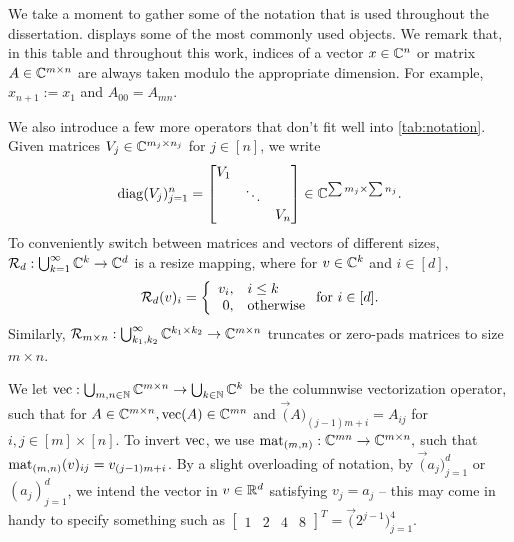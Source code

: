 We take a moment to gather some of the notation that is used throughout the dissertation.   displays some of the most commonly used objects.  We remark that, in this table and throughout this work, indices of a vector $x \in \Cn$ or matrix $A \in \Cmxn$ are always taken modulo the appropriate dimension.  For example, $x_{n + 1} := x_1$ and $A_{00} = A_{mn}$.

We also introduce a few more operators that don't fit well into \cref{tab:notation}.  Given matrices $V_j \in \C^{m_j \times n_j}$ for $j \in [n]$, we write \[\diag(V_j)_{j = 1}^n = \begin{bmatrix} V_1 & & \\ & \ddots & \\ & & V_n \end{bmatrix} \in \C^{\sum m_j \times \sum n_j}.\]  To conveniently switch between matrices and vectors of different sizes, $\mathcal{R}_d : \bigcup_{k = 1}^\infty \C^k \to \C^d$ is a resize mapping, where for $v \in \C^k$ and $i \in [d],$ $$\mathcal{R}_d(v)_i = \left\{\begin{array}{r@{,\quad}l} v_i & i \le k \\ 0 & \text{otherwise} \end{array}\right. \text{for}\ i \in [d].$$  Similarly, $\mathcal{R}_{m \times n} : \bigcup_{k_1, k_2}^\infty \C^{k_1 \times k_2} \to \C^{m \times n}$ truncates or zero-pads matrices to size $m \times n$.  

We let $\vec : \bigcup_{m, n \in \N} \C^{m \times n} \to \bigcup_{k \in \N} \C^k$ be the columnwise vectorization operator, such that for $A \in \C^{m \times n}, \vec(A) \in \C^{m n}$ and  $\vec(A)_{(j - 1) m + i} = A_{i j}$ for $i, j \in [m] \times [n]$.  To invert $\vec$, we use $\mat_{(m, n)} : \C^{m n} \to \C^{m \times n},$ such that $\mat_{(m, n)}(v)_{ij} = v_{(j - 1) m + i}$.  By a slight overloading of notation, by $\vec(a_j)_{j = 1}^d$ or $(a_j)_{j=1}^d$, we intend the vector in $v \in \R^d$ satisfying $v_j = a_j$ -- this may come in handy to specify something such as $\begin{bmatrix} 1 & 2 & 4 & 8 \end{bmatrix}^T = \vec(2^{j - 1})_{j = 1}^4$.
{\newcommand{\env}[1]{\texttt{#1}}\renewcommand{\thefootnote}{\fnsymbol{footnote}}
  \centering \renewcommand{\arraystretch}{1.5}
}
{\renewcommand{\thefootnote}{\fnsymbol{footnote}}}
